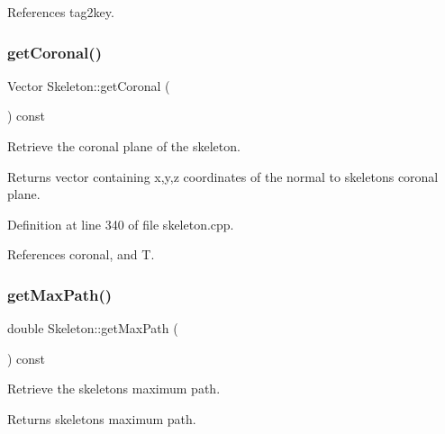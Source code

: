 References tag2key.

\mbox{\label{classassistive__rehab_1_1Skeleton_aa241a0ac93a9ead198f985073c8935eb}} 
\subsubsection{\texorpdfstring{getCoronal()}{getCoronal()}}
{\footnotesize\ttfamily Vector Skeleton\+::get\+Coronal (\begin{DoxyParamCaption}{ }\end{DoxyParamCaption}) const}



Retrieve the coronal plane of the skeleton. 

\begin{DoxyReturn}{Returns}
vector containing x,y,z coordinates of the normal to skeleton\textquotesingle{}s coronal plane. 
\end{DoxyReturn}


Definition at line 340 of file skeleton.\+cpp.


\begin{DoxyCode}{0}

\end{DoxyCode}


References coronal, and T.

\mbox{\label{classassistive__rehab_1_1Skeleton_acda9030cd2ed3ad92697418a5e2cff7c}} 
\subsubsection{\texorpdfstring{getMaxPath()}{getMaxPath()}}
{\footnotesize\ttfamily double Skeleton\+::get\+Max\+Path (\begin{DoxyParamCaption}{ }\end{DoxyParamCaption}) const}



Retrieve the skeleton\textquotesingle{}s maximum path. 

\begin{DoxyReturn}{Returns}
skeleton\textquotesingle{}s maximum path. 
\end{DoxyReturn}


